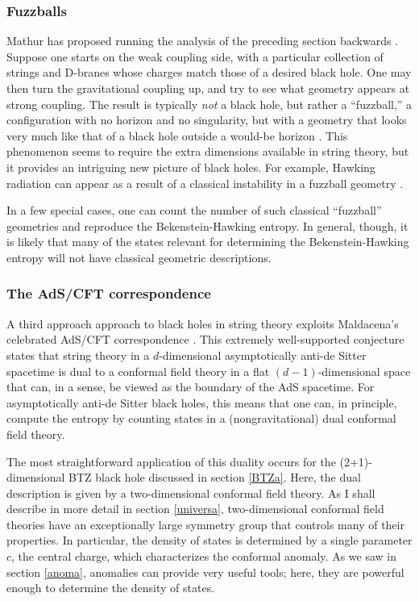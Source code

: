 \documentclass[11pt]{article}
\begin{document}
\subsubsection{Fuzzballs \label{fuzza}}

Mathur has proposed running the analysis of the 
preceding section backwards \cite{Mathur}.  Suppose one starts on
the weak coupling side, with a particular collection of strings and
D-branes whose charges match those of a desired black hole.  One
may then turn the gravitational coupling up, and try to see what 
geometry appears at strong coupling.  The result is typically 
\emph{not} a black hole, but rather a ``fuzzball,'' a configuration 
with no horizon and no singularity, but with a geometry that looks 
very much like that of a  black hole outside a would-be horizon 
\cite{Mathurb,Mathurc}.  This phenomenon seems to require 
the extra dimensions available in string theory, but it provides
an intriguing new picture of black holes.  For example, Hawking 
radiation can appear as a result of a classical instability in a
fuzzball geometry \cite{Chowdhury}.

 In a few special cases, one can count the number of such 
classical ``fuzzball'' geometries and reproduce the 
Bekenstein-Hawking entropy.  In general, though, it is
likely that many of the states relevant for determining the
Bekenstein-Hawking entropy will not have classical geometric
descriptions.

\subsubsection{The AdS/CFT correspondence \label{adscfta}}

A third approach approach to black 
holes in string theory exploits Maldacena's celebrated AdS/CFT 
correspondence \cite{Malda,AGMOO}.  This extremely well-supported 
conjecture states that string theory in a $d$-dimensional 
asymptotically anti-de Sitter spacetime is dual to a conformal field 
theory in a flat $(d-1)$-dimensional space that can, in a sense, 
be viewed as the boundary of the AdS spacetime.  For asymptotically 
anti-de Sitter black holes, this means that one can, in principle,
compute the entropy by counting states in a (nongravitational) dual 
conformal field theory.  

The most straightforward application of this duality occurs for the
(2+1)-dimensional BTZ black hole discussed in section \ref{BTZa}.
Here, the dual description is given by a two-dimensional  conformal 
field theory.  As I shall describe in more detail in section \ref{universa},
two-dimensional conformal field theories have an exceptionally
large symmetry group that controls many of their properties.  In
particular, the density of states is determined by a single parameter
$c$, the central charge, which characterizes the conformal anomaly.
As we saw in section \ref{anoma}, anomalies can provide very useful
tools; here, they are powerful enough to determine the density of
states.
 
\end{document}
